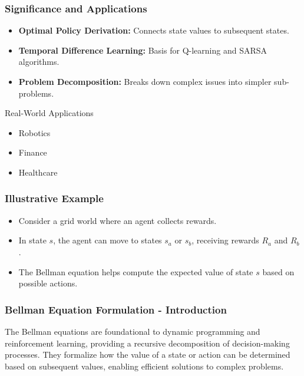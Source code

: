 \documentclass[aspectratio=169]{beamer}
\begin{document}
\begin{frame}[fragile]
  \frametitle{Significance and Applications}
  \begin{itemize}
    \item \textbf{Optimal Policy Derivation:} Connects state values to subsequent states.
    \item \textbf{Temporal Difference Learning:} Basis for Q-learning and SARSA algorithms.
    \item \textbf{Problem Decomposition:} Breaks down complex issues into simpler sub-problems.
  \end{itemize}

  \begin{block}{Real-World Applications}
    \begin{itemize}
      \item Robotics
      \item Finance
      \item Healthcare
    \end{itemize}
  \end{block}
\end{frame}

\begin{frame}[fragile]
  \frametitle{Illustrative Example}
  \begin{itemize}
    \item Consider a grid world where an agent collects rewards.
    \item In state \(s\), the agent can move to states \(s_a\) or \(s_b\), receiving rewards \(R_a\) and \(R_b\).
    \item The Bellman equation helps compute the expected value of state \(s\) based on possible actions.
  \end{itemize}
\end{frame}

\begin{frame}[fragile]
  \frametitle{Bellman Equation Formulation - Introduction}
  The Bellman equations are foundational to dynamic programming and reinforcement learning, providing a recursive decomposition of decision-making processes. They formalize how the value of a state or action can be determined based on subsequent values, enabling efficient solutions to complex problems.
\end{frame}
\end{document}
